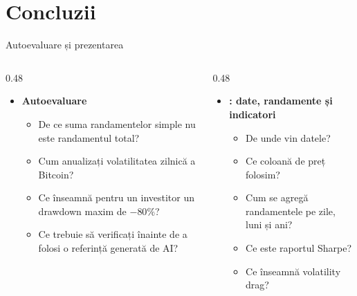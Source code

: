 \section{Concluzii}

\begin{frame}{Autoevaluare și prezentarea }
\itemsize{\small}
\begin{columns}[T]
\begin{column}{0.48\textwidth}
\begin{itemize}
    \item \textbf{Autoevaluare}
    \begin{itemize}
        \item De ce suma randamentelor simple nu este randamentul total?
        \item Cum anualizați volatilitatea zilnică a Bitcoin?
        \item Ce înseamnă pentru un investitor un drawdown maxim de $-80\%$?
        \item Ce trebuie să verificați înainte de a folosi o referință generată de AI?
    \end{itemize}
\end{itemize}
\end{column}
\begin{column}{0.48\textwidth}
\begin{itemize}
    \item \textbf{: date, randamente și indicatori}
    \begin{itemize}
        \item De unde vin datele?
        \item Ce coloană de preț folosim?
        \item Cum se agregă randamentele pe zile, luni și ani?
        \item Ce este raportul Sharpe?
        \item Ce înseamnă volatility drag?
    \end{itemize}
\end{itemize}
\end{column}
\end{columns}
\end{frame}


